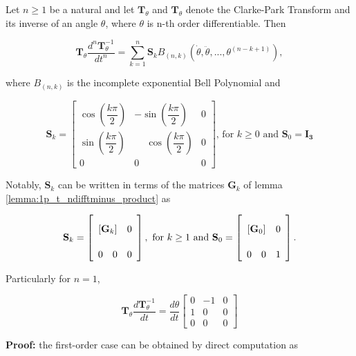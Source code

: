\begin{lemma} \label{lemma:t_ndifftminus_product}%

	Let $n\geq 1$ be a natural and let $\mathbf{T}_\theta$ and $\mathbf{T}_\theta$ denote the Clarke-Park Transform and its inverse of an angle $\theta$, where $\theta$ is n-th order differentiable. Then

\begin{equation} \mathbf{T}_\theta \dfrac{d^n\mathbf{T}^{-1}_\theta}{dt^n} = \sum\limits_{k=1}^n \mathbf{S}_k B_{\left(n,k\right)}\left(\dot{\theta},\ddot{\theta},...,\theta^{(n-k+1)}\right), \end{equation}

	where $B_{\left(n,k\right)}$ is the incomplete exponential Bell Polynomial and

\begin{equation}
\mathbf{S}_k = 
\left[\begin{array}{ccc}
 \cos\left( \dfrac{k\pi}{2}\right) &  -\sin\left(\dfrac{k\pi}{2}\right) & 0\\[5mm]
 \sin\left( \dfrac{k\pi}{2}\right) &  \phantom{-}\cos\left(\dfrac{k\pi}{2}\right) & 0\\[5mm]
0 & 0 & 0
\end{array}\right] \text{, for } k\geq 0 \text{ and } \mathbf{S}_0 = \mathbf{I_3}
\end{equation}

	Notably, $\mathbf{S}_k$ can be written in terms of the matrices $\mathbf{G}_k$ of lemma \ref{lemma:1p_t_ndifftminus_product} as

\begin{equation}
\mathbf{S}_k = 
\left[\begin{array}{ccc} \\[-1mm]
\multicolumn{2}{c}{\left[\mathbf{G}_k\right]} & 0\\[5mm]
0 & 0 & 0
\end{array}\right], \text{ for } k\geq 1 \text{ and }
%
\mathbf{S}_0 = 
\left[\begin{array}{ccc} \\[-1mm]
\multicolumn{2}{c}{\left[\mathbf{G}_0\right]} & 0\\[5mm]
0 & 0 & 1
\end{array}\right]. \label{eq:sk_gk_equiv}
\end{equation}

	Particularly for $n=1$,

\begin{equation} \mathbf{T}_\theta\dfrac{d\mathbf{T}_\theta^{-1}}{dt} = \dfrac{d\theta}{dt} \left[\begin{array}{ccc}    0 & -1 & 0 \\[5mm] 1 & 0  & 0 \\[5mm]  0 & 0  & 0 \end{array}\right] \end{equation}

\end{lemma}
\textbf{Proof:} the first-order case can be obtained by direct computation as

